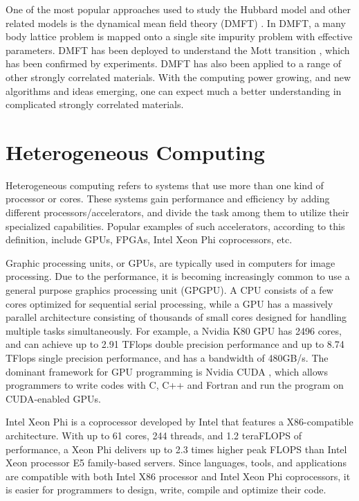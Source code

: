 One of the most popular approaches used to study the Hubbard model and other related
models is the dynamical mean field theory (DMFT)
\cite{PhysRevB.45.6479,PhysRevLett.69.168,RevModPhys.68.13,PhysRevLett.69.1236,PhysRevLett.69.1240}. 
In DMFT, a many body lattice
problem is mapped onto a single site impurity problem with effective parameters.
DMFT has been deployed to understand the Mott transition 
\cite{PhysRevLett.69.1796,PhysRevLett.70.1666,PhysRevB.48.7167},
which has been confirmed
by experiments\cite{PhysRevLett.75.105,PhysRevB.58.3690,PhysRevLett.90.186403}. 
DMFT has also been applied to a range of other strongly correlated 
materials. With the computing power growing, and new algorithms and ideas emerging, 
one can expect much a better understanding in complicated strongly correlated 
materials.

\section{Heterogeneous Computing}
Heterogeneous computing refers to systems that use more than one kind of 
processor or cores. These systems gain performance and efficiency by adding
different processors/accelerators, and divide the task among them to utilize 
their specialized capabilities. 
Popular examples of such accelerators, according to this definition, include 
GPUs, FPGAs, Intel Xeon Phi coprocessors, etc.


Graphic processing units, or GPUs, are typically used in computers for image 
processing. 
Due to the performance, it is becoming increasingly common to use a general purpose 
graphics processing unit (GPGPU).
A CPU consists of a few cores optimized for sequential serial processing,
while a GPU has a massively parallel architecture 
consisting of thousands of small cores designed for handling multiple tasks 
simultaneously.
For example, a Nvidia K80 GPU \cite{nv_k80_spec} has 2496 cores, and can achieve up to 2.91 TFlops 
double precision performance and up to 8.74 TFlops single precision performance, 
and has a bandwidth of 480GB/s.
The dominant framework for GPU programming is Nvidia CUDA \cite{Nickolls:2008:SPP:1365490.1365500}, which allows 
programmers to write codes with C, C++ and Fortran and run the program on CUDA-enabled 
GPUs.


Intel Xeon Phi\cite{Jeffers:2013:IXP:2523262} is a coprocessor developed by Intel that features a 
X86-compatible architecture. With up to 61 cores, 244 threads, 
and 1.2 teraFLOPS of performance, a Xeon Phi delivers up to 2.3 times higher 
peak FLOPS than Intel Xeon processor E5 family-based servers.
Since languages, tools, and applications are compatible with both Intel X86 
processor and Intel Xeon Phi coprocessors, it is easier for programmers to
design, write, compile and optimize their code. 


